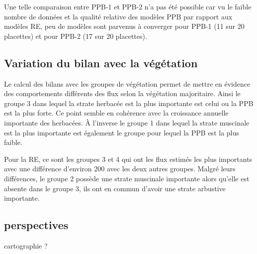 Une telle comparaison entre PPB-1 et PPB-2 n'a pas été possible car vu le faible nombre de données et la qualité relative des modèles PPB par rapport aux modèles RE, peu de modèles sont parvenus à converger pour PPB-1 (11 sur 20 placettes) et pour PPB-2 (17 sur 20 placettes).

\subsection{Variation du bilan avec la végétation}
Le calcul des bilans avec les groupes de végétation permet de mettre en évidence des comportements différents des flux selon la végétation majoritaire.
Ainsi le groupe 3 dans lequel la strate herbacée est la plus importante est celui ou la PPB est la plus forte.
Ce point semble en cohérence avec la croissance annuelle importante des herbacées.
À l'inverse le groupe 1 dans lequel la strate muscinale est la plus importante est également le groupe pour lequel la PPB est la plus faible.
\plop

Pour la RE, ce sont les groupes 3 et 4 qui ont les flux estimés les plus importants avec une différence d'environ \SI{200}{\gcma} avec les deux autres groupes.
Malgré leurs différences, le groupe 2 possède une strate muscinale importante alors qu'elle est absente dans le groupe 3, ils ont en commun d'avoir une strate arbustive importante.


\subsection{perspectives}

cartographie ?

